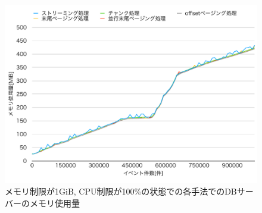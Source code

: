 \documentclass[../../../main]{subfiles}
\begin{document}
    \begin{figure}[H]
        \centering
        \includegraphics[width=12cm]{graph}
        \caption{メモリ制限が1GiB, CPU制限が100\%の状態での各手法でのDBサーバーのメモリ使用量}
        \label{fig:db-memory}
    \end{figure}
\end{document}
